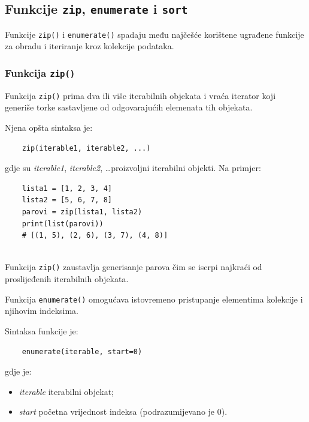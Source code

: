 \subsection{Funkcije \texttt{zip}, \texttt{enumerate} i \texttt{sort}}

Funkcije \texttt{zip()} i \texttt{enumerate()} spadaju među najčešće korištene ugrađene funkcije za obradu i iteriranje kroz kolekcije podataka.

\subsubsection*{Funkcija \texttt{zip()}}

Funkcija \texttt{zip()} prima dva ili više iterabilnih objekata i vraća iterator koji generiše torke sastavljene od odgovarajućih elemenata tih objekata.

Njena opšta sintaksa je:
\begin{verbatim}
	zip(iterable1, iterable2, ...)
\end{verbatim}

gdje su \textit{iterable1}, \textit{iterable2}, \ldots proizvoljni iterabilni objekti. Na primjer:

\begin{verbatim}
	lista1 = [1, 2, 3, 4]
	lista2 = [5, 6, 7, 8]
	parovi = zip(lista1, lista2)
	print(list(parovi))
	# [(1, 5), (2, 6), (3, 7), (4, 8)]
	
\end{verbatim}

Funkcija \texttt{zip()} zaustavlja generisanje parova čim se iscrpi najkraći od proslijeđenih iterabilnih objekata.


Funkcija \texttt{enumerate()} omogućava istovremeno pristupanje elementima kolekcije i njihovim indeksima.

Sintaksa funkcije je:

\begin{verbatim}
	enumerate(iterable, start=0)
\end{verbatim}

gdje je:

\begin{itemize}
	\item \textit{iterable} iterabilni objekat;
	\item \textit{start} početna vrijednost indeksa (podrazumijevano je 0).
\end{itemize}


